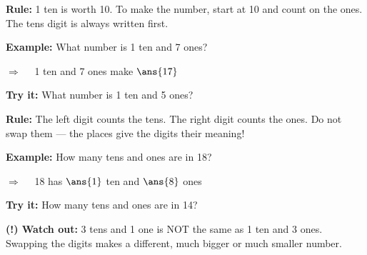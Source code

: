 \documentclass[12pt]{article}
\begin{document}


\begin{formulabox}
\textbf{Rule:} 1 ten is worth 10. To make the number, start at 10 and count
on the ones. The tens digit is always written first.
\end{formulabox}

\begin{examplebox}
\textbf{Example:} \quad What number is 1 ten and 7 ones?

$\Rightarrow\quad$ 1 ten and 7 ones make $\ans{17}$
\end{examplebox}

\begin{tryitbox}
\textbf{Try it:} \quad What number is 1 ten and 5 ones?\\[2pt]
\end{tryitbox}


\begin{formulabox}
\textbf{Rule:} The left digit counts the tens. The right digit counts the
ones. Do not swap them --- the places give the digits their meaning!
\end{formulabox}

\begin{examplebox}
\textbf{Example:} \quad How many tens and ones are in 18?

$\Rightarrow\quad$ 18 has $\ans{1}$ ten and $\ans{8}$ ones
\end{examplebox}

\begin{tryitbox}
\textbf{Try it:} \quad How many tens and ones are in 14?\\[2pt]
\end{tryitbox}

\begin{watchoutbox}
\textbf{(!) Watch out:} 3 tens and 1 one is NOT the same as 1 ten and 3 ones.
Swapping the digits makes a different, much bigger or much smaller number.
\end{watchoutbox}
\end{document}
